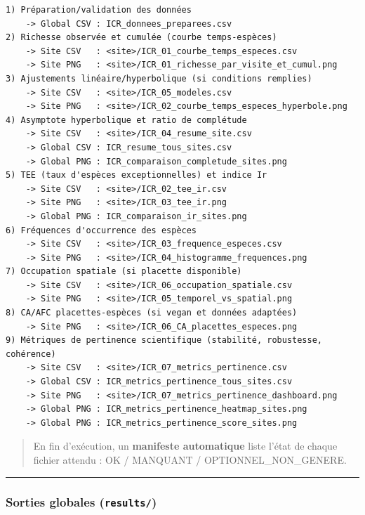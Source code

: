 \begin{verbatim}
1) Préparation/validation des données
    -> Global CSV : ICR_donnees_preparees.csv
2) Richesse observée et cumulée (courbe temps-espèces)
    -> Site CSV   : <site>/ICR_01_courbe_temps_especes.csv
    -> Site PNG   : <site>/ICR_01_richesse_par_visite_et_cumul.png
3) Ajustements linéaire/hyperbolique (si conditions remplies)
    -> Site CSV   : <site>/ICR_05_modeles.csv
    -> Site PNG   : <site>/ICR_02_courbe_temps_especes_hyperbole.png
4) Asymptote hyperbolique et ratio de complétude
    -> Site CSV   : <site>/ICR_04_resume_site.csv
    -> Global CSV : ICR_resume_tous_sites.csv
    -> Global PNG : ICR_comparaison_completude_sites.png
5) TEE (taux d'espèces exceptionnelles) et indice Ir
    -> Site CSV   : <site>/ICR_02_tee_ir.csv
    -> Site PNG   : <site>/ICR_03_tee_ir.png
    -> Global PNG : ICR_comparaison_ir_sites.png
6) Fréquences d'occurrence des espèces
    -> Site CSV   : <site>/ICR_03_frequence_especes.csv
    -> Site PNG   : <site>/ICR_04_histogramme_frequences.png
7) Occupation spatiale (si placette disponible)
    -> Site CSV   : <site>/ICR_06_occupation_spatiale.csv
    -> Site PNG   : <site>/ICR_05_temporel_vs_spatial.png
8) CA/AFC placettes-espèces (si vegan et données adaptées)
    -> Site PNG   : <site>/ICR_06_CA_placettes_especes.png
9) Métriques de pertinence scientifique (stabilité, robustesse, cohérence)
    -> Site CSV   : <site>/ICR_07_metrics_pertinence.csv
    -> Global CSV : ICR_metrics_pertinence_tous_sites.csv
    -> Site PNG   : <site>/ICR_07_metrics_pertinence_dashboard.png
    -> Global PNG : ICR_metrics_pertinence_heatmap_sites.png
    -> Global PNG : ICR_metrics_pertinence_score_sites.png
\end{verbatim}

\begin{quote}
En fin d'exécution, un \textbf{manifeste automatique} liste l'état de
chaque fichier attendu : OK / MANQUANT / OPTIONNEL\_NON\_GENERE.
\end{quote}

\begin{center}\rule{0.5\linewidth}{0.5pt}\end{center}

\subsubsection{\texorpdfstring{Sorties globales
(\texttt{results/})}{Sorties globales (results/)}}\label{sorties-globales-results}


